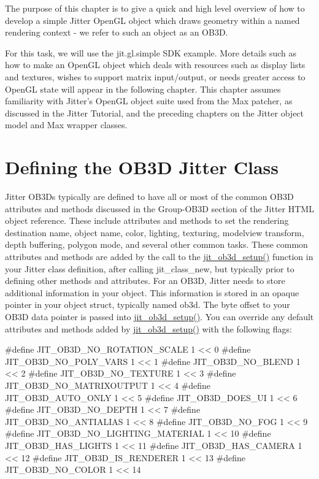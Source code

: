 The purpose of this chapter is to give a quick and high level overview of how to develop a simple Jitter OpenGL object which draws geometry within a named rendering context -\/ we refer to such an object as an OB3D.

For this task, we will use the jit.gl.simple SDK example. More details such as how to make an OpenGL object which deals with resources such as display lists and textures, wishes to support matrix input/output, or needs greater access to OpenGL state will appear in the following chapter. This chapter assumes familiarity with Jitter's OpenGL object suite used from the Max patcher, as discussed in the Jitter Tutorial, and the preceding chapters on the Jitter object model and Max wrapper classes.\hypertarget{chapter_jit_ob3dqs_chapter_jit_ob3dqs_classdef}{}\section{Defining the OB3D Jitter Class}\label{chapter_jit_ob3dqs_chapter_jit_ob3dqs_classdef}
Jitter OB3Ds typically are defined to have all or most of the common OB3D attributes and methods discussed in the Group-\/OB3D section of the Jitter HTML object reference. These include attributes and methods to set the rendering destination name, object name, color, lighting, texturing, modelview transform, depth buffering, polygon mode, and several other common tasks. These common attributes and methods are added by the call to the \hyperlink{group__ob3dmod_gaee60152a1d507a630e14f0e4f71e86f2}{jit\_\-ob3d\_\-setup()} function in your Jitter class definition, after calling jit\_\-class\_\-new, but typically prior to defining other methods and attributes. For an OB3D, Jitter needs to store additional information in your object. This information is stored in an opaque pointer in your object struct, typically named ob3d. The byte offset to your OB3D data pointer is passed into \hyperlink{group__ob3dmod_gaee60152a1d507a630e14f0e4f71e86f2}{jit\_\-ob3d\_\-setup()}. You can override any default attributes and methods added by \hyperlink{group__ob3dmod_gaee60152a1d507a630e14f0e4f71e86f2}{jit\_\-ob3d\_\-setup()} with the following flags:


\begin{DoxyCode}
#define JIT_OB3D_NO_ROTATION_SCALE      1 << 0
#define JIT_OB3D_NO_POLY_VARS         1 << 1
#define JIT_OB3D_NO_BLEND              1 << 2
#define JIT_OB3D_NO_TEXTURE         1 << 3
#define JIT_OB3D_NO_MATRIXOUTPUT      1 << 4
#define JIT_OB3D_AUTO_ONLY         1 << 5
#define JIT_OB3D_DOES_UI         1 << 6
#define JIT_OB3D_NO_DEPTH         1 << 7
#define JIT_OB3D_NO_ANTIALIAS         1 << 8
#define JIT_OB3D_NO_FOG            1 << 9
#define JIT_OB3D_NO_LIGHTING_MATERIAL      1 << 10
#define JIT_OB3D_HAS_LIGHTS         1 << 11
#define JIT_OB3D_HAS_CAMERA         1 << 12
#define JIT_OB3D_IS_RENDERER         1 << 13
#define JIT_OB3D_NO_COLOR         1 << 14
\end{DoxyCode}


